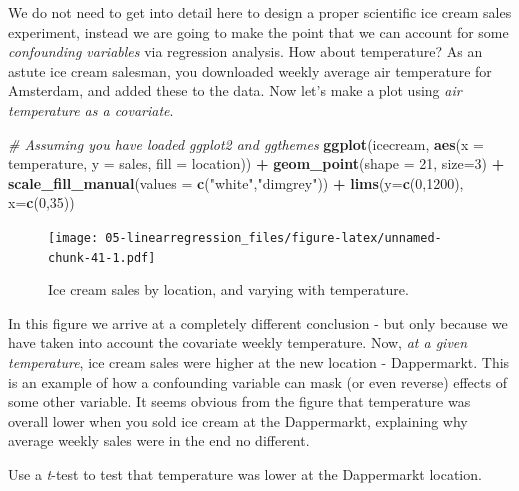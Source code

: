 \documentclass[]{book}
\newenvironment{Shaded}{\begin{snugshade}}{\end{snugshade}}
\newcommand{\CommentTok}[1]{\textcolor[rgb]{0.56,0.35,0.01}{\textit{#1}}}
\newcommand{\DataTypeTok}[1]{\textcolor[rgb]{0.13,0.29,0.53}{#1}}
\newcommand{\DecValTok}[1]{\textcolor[rgb]{0.00,0.00,0.81}{#1}}
\newcommand{\KeywordTok}[1]{\textcolor[rgb]{0.13,0.29,0.53}{\textbf{#1}}}
\newcommand{\NormalTok}[1]{#1}
\newcommand{\OperatorTok}[1]{\textcolor[rgb]{0.81,0.36,0.00}{\textbf{#1}}}
\newcommand{\StringTok}[1]{\textcolor[rgb]{0.31,0.60,0.02}{#1}}
\let\BeginKnitrBlock\begin \let\EndKnitrBlock\end
\begin{document}
We do not need to get into detail here to design a proper scientific ice cream sales experiment, instead we are going to make the point that we can account for some \emph{confounding variables} via regression analysis. How about temperature? As an astute ice cream salesman, you downloaded weekly average air temperature for Amsterdam, and added these to the data. Now let's make a plot using \emph{air temperature as a covariate}.

\begin{Shaded}
\begin{Highlighting}[]
\CommentTok{# Assuming you have loaded ggplot2 and ggthemes}
\KeywordTok{ggplot}\NormalTok{(icecream, }\KeywordTok{aes}\NormalTok{(}\DataTypeTok{x =}\NormalTok{ temperature, }\DataTypeTok{y =}\NormalTok{ sales, }\DataTypeTok{fill =}\NormalTok{ location)) }\OperatorTok{+}
\StringTok{  }\KeywordTok{geom_point}\NormalTok{(}\DataTypeTok{shape =} \DecValTok{21}\NormalTok{, }\DataTypeTok{size=}\DecValTok{3}\NormalTok{) }\OperatorTok{+}
\StringTok{  }\KeywordTok{scale_fill_manual}\NormalTok{(}\DataTypeTok{values =} \KeywordTok{c}\NormalTok{(}\StringTok{"white"}\NormalTok{,}\StringTok{"dimgrey"}\NormalTok{)) }\OperatorTok{+}
\StringTok{  }\KeywordTok{lims}\NormalTok{(}\DataTypeTok{y=}\KeywordTok{c}\NormalTok{(}\DecValTok{0}\NormalTok{,}\DecValTok{1200}\NormalTok{), }\DataTypeTok{x=}\KeywordTok{c}\NormalTok{(}\DecValTok{0}\NormalTok{,}\DecValTok{35}\NormalTok{))}
\end{Highlighting}
\end{Shaded}

\begin{figure}
\centering
\texttt{[image: 05-linearregression\_files/figure-latex/unnamed-chunk-41-1.pdf]}
\caption{\label{fig:unnamed-chunk-41}Ice cream sales by location, and varying with temperature.}
\end{figure}

In this figure we arrive at a completely different conclusion - but only because we have taken into account the covariate weekly temperature. Now, \emph{at a given temperature}, ice cream sales were higher at the new location - Dappermarkt. This is an example of how a confounding variable can mask (or even reverse) effects of some other variable. It seems obvious from the figure that temperature was overall lower when you sold ice cream at the Dappermarkt, explaining why average weekly sales were in the end no different.

\BeginKnitrBlock{rmdtry}
Use a \emph{t}-test to test that temperature was lower at the Dappermarkt location.
\EndKnitrBlock{rmdtry}
\end{document}

